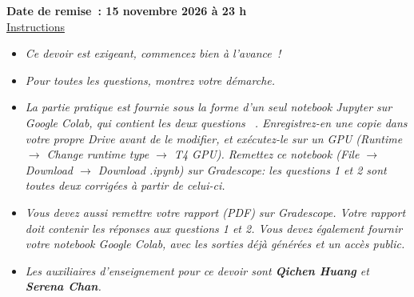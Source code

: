 \documentclass[12pt]{article}
\theoremstyle{definition}
\begin{document}
\fancyhead{}
\fancyfoot{}


\vspace{1cm}

\shorthandoff{:}
{\textbf{Date de remise~: 15 novembre 2026 à 23 h}}\\


\vspace{-0.5cm}
\underline{Instructions}%
\renewcommand{\labelitemi}{\textbullet}

\renewcommand{\labelitemi}{\textbullet}

\begin{itemize}
\item \emph{Ce devoir est exigeant, commencez bien à l'avance~!}
\item \emph{Pour toutes les questions, montrez votre démarche.}
\item \emph{La partie pratique est fournie sous la forme d'un seul notebook Jupyter sur Google Colab, qui contient les
deux questions~} \emph{. Enregistrez-en une copie dans votre propre Drive avant de le modifier, et exécutez-le sur un GPU
(Runtime $\rightarrow$ Change runtime type $\rightarrow$ T4 GPU). Remettez ce notebook (File $\rightarrow$ Download
$\rightarrow$ Download .ipynb) sur Gradescope: les questions 1 et 2 sont toutes deux
corrigées à partir de celui-ci.}
\item \emph{Vous devez aussi remettre votre rapport (PDF) sur Gradescope. Votre rapport doit contenir les réponses
aux questions 1 et 2. Vous devez également fournir votre notebook Google Colab, avec les sorties déjà générées et un
accès public.}
\item \emph{Les auxiliaires d'enseignement pour ce devoir sont \textbf{Qichen Huang} et \textbf{Serena Chan}.}
\end{itemize}
\vspace{0.2cm}
\end{document}
